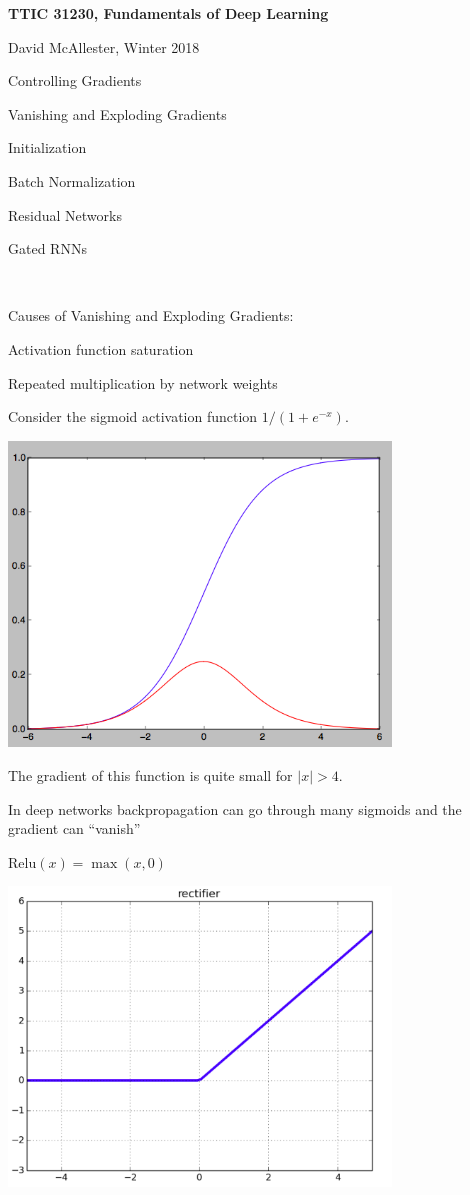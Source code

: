 



{\Huge

  \centerline{\bf TTIC 31230, Fundamentals of Deep Learning}
  \bigskip
  \centerline{David McAllester, Winter 2018}
  \vfill
  \centerline{Controlling Gradients}
  \vfill
  \vfill
  \centerline{Vanishing and Exploding Gradients}
  \vfill
  \centerline{Initialization}
  \vfill
  \centerline{Batch Normalization}
  \vfill
  \centerline{Residual Networks}
  \vfill
  \centerline{Gated RNNs}

~
\vfill
\centerline{Causes of Vanishing and Exploding Gradients:}
\vfill
\centerline{Activation function saturation}
\vfill
\centerline{Repeated multiplication by network weights}
\vfill


Consider the sigmoid activation function $1/(1+ e^{-x})$.

\vfill
\centerline{\includegraphics[width= 4.0in]{../images/sigmoid2}}


\vfill
The gradient of this function is quite small for $|x| > 4$.

\vfill
In deep networks backpropagation can go through many sigmoids and
the gradient can ``vanish''


$\mathrm{Relu}(x) = \max(x,0)$

\vfill
\centerline{\includegraphics[width= 4.0in]{../images/relu}}

}
